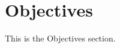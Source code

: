 \documentclass[proposal.tex]{subfiles}
\begin{document}
    
\section{Objectives}

This is the Objectives section.
\end{document}
